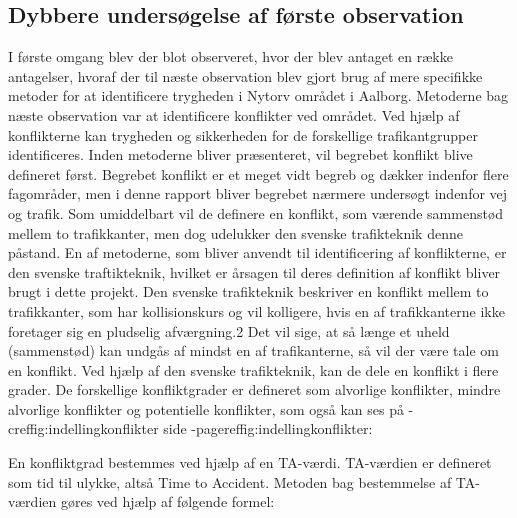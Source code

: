 \subsection{Dybbere undersøgelse af første observation}
\label{sec:dybundersogelse}
I første omgang blev der blot observeret, hvor der blev antaget en række antagelser, hvoraf der til næste observation blev gjort brug af mere specifikke metoder for at identificere trygheden i Nytorv området i Aalborg.
Metoderne bag næste observation var at identificere konflikter ved området. Ved hjælp af konflikterne kan trygheden og sikkerheden for de forskellige trafikantgrupper identificeres. Inden metoderne bliver præsenteret, vil begrebet konflikt blive defineret først. Begrebet konflikt er et meget vidt begreb og dækker indenfor flere fagområder, men i denne rapport bliver begrebet nærmere undersøgt indenfor vej og trafik. Som umiddelbart vil de definere en konflikt, som værende sammenstød mellem to trafikkanter, men dog udelukker den svenske trafikteknik denne påstand.%
En af metoderne, som bliver anvendt til identificering af konflikterne, er den svenske traftikteknik, hvilket er årsagen til deres definition af konflikt bliver brugt i dette projekt.
Den svenske trafikteknik beskriver en konflikt mellem to trafikkanter, som har kollisionskurs og vil kolligere, hvis en af trafikkanterne ikke foretager sig en pludselig afværgning.2 Det vil sige, at så længe et uheld (sammenstød) kan undgås af mindst en af trafikanterne, så vil der være tale om en konflikt. Ved hjælp af den svenske trafikteknik, kan de dele en konflikt i flere grader. De forskellige konfliktgrader er defineret som alvorlige konflikter, mindre alvorlige konflikter og potentielle konflikter, som også kan ses på -cref{fig:indellingkonflikter} side -pageref{fig:indellingkonflikter}:
\newpage

En konfliktgrad bestemmes ved hjælp af en TA-værdi. TA-værdien er defineret som tid til ulykke, altså Time to Accident. Metoden bag bestemmelse af TA-værdien gøres ved hjælp af følgende formel:


